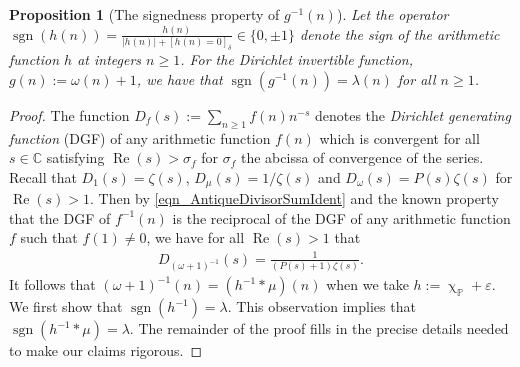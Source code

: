\documentclass[11pt,reqno,a4letter]{article}
\numberwithin{figure}{section}
\numberwithin{table}{section}
\newcommand{\Iverson}[1]{\ensuremath{\left[#1\right]_{\delta}}}
\renewcommand{\chi}{\upchi}
\theoremstyle{plain}
\newtheorem{prop}[theorem]{Proposition}
\numberwithin{theorem}{section}
\theoremstyle{definition}
\newcommand{\NBRef}[1]{}
\renewcommand{\Re}{\operatorname{Re}}
\begin{document}
\begin{prop}[The signedness property of $g^{-1}(n)$]
\label{prop_SignageDirInvsOfPosBddArithmeticFuncs_v1} 
Let the operator 
$\operatorname{sgn}(h(n)) = \frac{h(n)}{|h(n)| + \Iverson{h(n) = 0}} \in \{0, \pm 1\}$ denote the sign 
of the arithmetic function $h$ at integers $n \geq 1$. 
For the Dirichlet invertible function, $g(n) := \omega(n) + 1$, 
we have that $\operatorname{sgn}(g^{-1}(n)) = \lambda(n)$ for all $n \geq 1$. 
\NBRef{A02-2020-04-26}
\end{prop} 
\begin{proof} 
The function $D_f(s) := \sum_{n \geq 1} f(n) n^{-s}$ denotes the 
\emph{Dirichlet generating function} (DGF) of any 
arithmetic function $f(n)$ which is convergent for all $s \in \mathbb{C}$ satisfying 
$\Re(s) > \sigma_f$ for $\sigma_f$ the abcissa of convergence of the series. 
Recall that $D_1(s) = \zeta(s)$, $D_{\mu}(s) = 1 / \zeta(s)$ and $D_{\omega}(s) = P(s) \zeta(s)$ for 
$\Re(s) > 1$. 
Then by \eqref{eqn_AntiqueDivisorSumIdent} and the known property that the DGF of $f^{-1}(n)$ is 
the reciprocal of the DGF of any arithmetic function $f$ such that $f(1) \neq 0$, 
we have for all $\Re(s) > 1$ that 
\begin{align} 
\label{eqn_DGF_of_gInvn} 
D_{(\omega+1)^{-1}}(s) = \frac{1}{(P(s)+1) \zeta(s)}. 
\end{align} 
It follows that $(\omega + 1)^{-1}(n) = (h^{-1} \ast \mu)(n)$ when we take 
$h := \chi_{\mathbb{P}} + \varepsilon$. 
We first show that $\operatorname{sgn}(h^{-1}) = \lambda$. 
This observation implies 
that $\operatorname{sgn}(h^{-1} \ast \mu) = \lambda$. The remainder of the proof fills in the 
precise details needed to make our claims rigorous. 


\end{proof}
\end{document}
